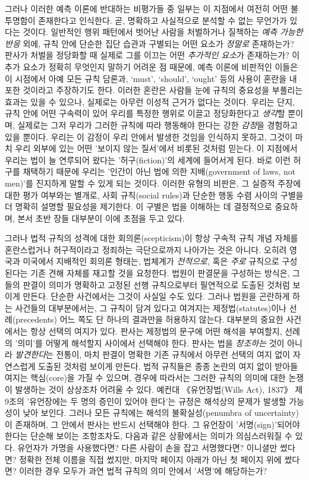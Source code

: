 \documentclass[12pt, oneside]{book}  %
\begin{document}
그러나 이러한 예측 이론에 반대하는 비평가들 중 일부는 이 지점에서 여전히
어떤 불투명함이 존재한다고 인식한다. 곧, 명확하고 사실적으로 분석할 수
없는 무언가가 있다는 것이다. 일반적인 행위 패턴에서 벗어난 사람을
처벌하거나 질책하는 \emph{예측 가능한 반응} 외에, 규칙 안에 단순한 집단
습관과 구별되는 어떤 요소가 \emph{정말로} 존재하는가? 판사가 처벌을
정당화할 때 실제로 그를 이끄는 어떤 \emph{추가적인 요소}가 존재하는가?
이 추가 요소가 정확히 무엇인지 말하기 어려운 점 때문에, 예측 이론에
비판적인 이들은 이 시점에서 아예 모든 규칙 담론과, `must', `should',
`ought' 등의 사용이 혼란을 내포한 것이라고 주장하기도 한다. 이러한
혼란은 사람들 눈에 규칙의 중요성을 부풀리는 효과는 있을 수 있으나,
실제로는 아무런 이성적 근거가 없다는 것이다. 우리는 단지, 규칙 안에 어떤
구속력이 있어 우리를 특정한 행위로 이끌고 정당화한다고 \emph{생각}할
뿐이며, 실제로는 그저 우리가 그러한 규칙에 따라 행동해야 한다는 강한
\emph{감정}을 경험하고 있을 뿐이다. 우리는 이 감정이 우리 안에서 발생한
것임을 인식하지 못하고, 그것이 마치 우리 외부에 있는 어떤 '보이지 않는
질서'에서 비롯된 것처럼 믿는다. 이 지점에서 우리는 법이 늘 연루되어
왔다는 '허구(fiction)'의 세계에 들어서게 된다. 바로 이런 허구를 채택하기
때문에 우리는 '인간이 아닌 법에 의한 지배(government of laws, not
men)'를 진지하게 말할 수 있게 되는 것이다. 이러한 유형의 비판은, 그
실증적 주장에 대한 평가 여부와는 별개로, 사회 규칙(social rules)과
단순한 행동 수렴 사이의 구별을 더 명확히 설명할 필요성을 제기한다. 이
구별은 법을 이해하는 데 결정적으로 중요하며, 본서 초반 장들 대부분이
이에 초점을 두고 있다.

그러나 법적 규칙의 성격에 대한 회의론(scepticism)이 항상 구속적 규칙
개념 자체를 혼란스럽거나 허구적이라고 정죄하는 극단으로까지 나아가는
것은 아니다. 오히려 영국과 미국에서 지배적인 회의론 형태는, 법체계가
\emph{전적으로}, 혹은 \emph{주로} 규칙으로 구성된다는 기존 견해 자체를
재고할 것을 요청한다. 법원이 판결문을 구성하는 방식은, 그들의 판결이
의미가 명확하고 고정된 선행 규칙으로부터 필연적으로 도출된 것처럼 보이게
만든다. 단순한 사건에서는 그것이 사실일 수도 있다. 그러나 법원을
곤란하게 하는 사건들의 대부분에서는, 그 규칙이 담겨 있다고 여겨지는
제정법(statutes)이나 선례(precedents) 어느 쪽도 단 하나의 결과만을
허용하지 않는다. 대부분의 중요한 사건에서는 항상 선택의 여지가 있다.
판사는 제정법의 문구에 어떤 해석을 부여할지, 선례의 '의미'를 어떻게
해석할지 사이에서 선택해야 한다. 판사는 법을 \emph{창조하는} 것이 아니라
\emph{발견한다}는 전통이, 마치 판결이 명확한 기존 규칙에서 아무런 선택의
여지 없이 자연스럽게 도출된 것처럼 보이게 만든다. 법적 규칙들은 종종
논란의 여지 없이 받아들여지는 핵심(core)을 가질 수 있으며, 경우에
따라서는 그러한 규칙의 의미에 대한 논쟁이 발생하는 것이 상상조차 어려울
수 있다. 예컨대 《유언장법(Wills Act), 1837》 제9조의 '유언장에는 두
명의 증인이 있어야 한다'는 규정은 해석상의 문제가 발생할 가능성이 낮아
보인다. 그러나 모든 규칙에는 해석의 불확실성(penumbra of uncertainty)이
존재하며, 그 안에서 판사는 반드시 선택해야 한다. 그 유언장이
'서명(sign)'되어야 한다는 단순해 보이는 조항조차도, 다음과 같은
상황에서는 의미가 의심스러워질 수 있다. 유언자가 가명을 사용했다면? 다른
사람이 손을 잡고 서명했다면? 이니셜만 썼다면? 정확한 전체 이름을 직접
썼지만, 마지막 페이지 아래가 아닌 첫 페이지 위에 썼다면? 이러한 경우
모두가 과연 법적 규칙의 의미 안에서 '서명'에 해당하는가?
\end{document}
